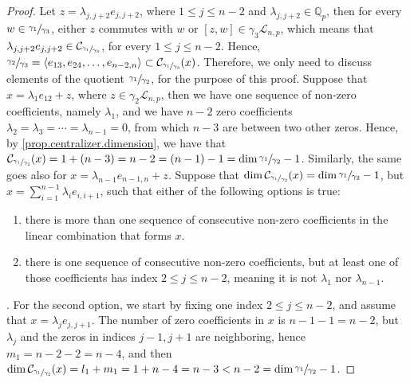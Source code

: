 \documentclass[12pt]{article}
\begin{document}
\begin{proof}
Let $z=\lambda_{j,j+2}e_{j,j+2}$, where $1\leq j\leq n-2$ and $\lambda_{j,j+2}\in\mathbb{Q}_p$, then for every $w\in\sfrac{\gamma_1}{\gamma_3}$, either $z$ commutes with $w$ or $[z,w]\in\gamma_3\mathcal{L}_{n,p}$, which means that $\lambda_{j,j+2}e_{j,j+2}\in\mathcal{C}_{\sfrac{\gamma_1}{\gamma_3}}$, for every $1\leq j\leq n-2$. Hence, $\sfrac{\gamma_2}{\gamma_3}=\langle e_{13},e_{24},\dots,e_{n-2,n}\rangle\subset\mathcal{C}_{\sfrac{\gamma_1}{\gamma_3}}(x)$. Therefore, we only need to discuss elements of the quotient $\sfrac{\gamma_1}{\gamma_2}$, for the purpose of this proof.
Suppose that $x=\lambda_1 e_{12}+z$, where $z\in\gamma_2 \mathcal{L}_{n,p}$, then we have one sequence of non-zero coefficients, namely $\lambda_1$, and we have $n-2$ zero coefficients $\lambda_2=\lambda_3=\cdots=\lambda_{n-1}=0$, from which $n-3$ are between two other zeros. Hence, by \ref{prop.centralizer.dimension}, we have that $\mathcal{C}_{\sfrac{\gamma_1}{\gamma_2}}(x)=1+(n-3)=n-2=(n-1)-1=\dim\sfrac{\gamma_1}{\gamma_2}-1$. Similarly, the same goes also for $x=\lambda_{n-1}e_{n-1,n}+z$.
Suppose that $\dim\mathcal{C}_{\sfrac{\gamma_1}{\gamma_2}}(x)=\dim\sfrac{\gamma_1}{\gamma_2}-1$, but $x=\sum_{i=1}^{n-1}\lambda_i e_{i,i+1}$, such that either of the following options is true:
\begin{enumerate}
  \item there is more than one sequence of consecutive non-zero coefficients in the linear combination that forms $x$.
  \item there is one sequence of consecutive non-zero coefficients, but at least one of those coefficients has index $2\leq j\leq n-2$, meaning it is not $\lambda_1$ nor $\lambda_{n-1}$.
\end{enumerate}.
For the second option, we start by fixing one index $2\leq j\leq n-2$, and assume that $x=\lambda_j e_{j,j+1}$. The number of zero coefficients in $x$ is $n-1-1=n-2$, but $\lambda_j$ and the zeros in indices $j-1,j+1$ are neighboring, hence $m_1=n-2-2=n-4$, and then $\dim\mathcal{C}_{\sfrac{\gamma_1}{\gamma_2}}(x)=l_1+m_1=1+n-4=n-3<n-2=\dim\sfrac{\gamma_1}{\gamma_2}-1$.

\end{proof}
\end{document}
